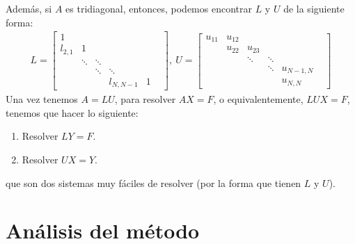 Además, si $A$ es tridiagonal, entonces, podemos encontrar $L$ y $U$ de la siguiente forma:
\begin{align*}
    L = \begin{bmatrix}
            1       &        &        &           &     \\
            l_{2,1} & 1      &        &           &     \\
                    & \ddots & \ddots &           &     \\
                    &        & \ddots & \ddots    &   & \\
                    &        &        & l_{N,N-1} & 1
        \end{bmatrix}, \ U  = \begin{bmatrix}
                                  u_{11} & u_{12} &        &        &             \\
                                         & u_{22} & u_{23} &        &             \\
                                         &        & \ddots & \ddots &             \\
                                         &        &        & \ddots & u_{N-1,N} & \\
                                         &        &        &        & u_{N,N}
                              \end{bmatrix}
\end{align*}
Una vez tenemos $A = LU$, para resolver $AX = F$, o equivalentemente, $LUX = F$, tenemos que hacer lo siguiente:
\begin{enumerate}
    \item Resolver $LY = F$.
    \item Resolver $UX = Y$.
\end{enumerate}
que son dos sistemas muy fáciles de resolver (por la forma que tienen $L$ y $U$).

\section{Análisis del método}

